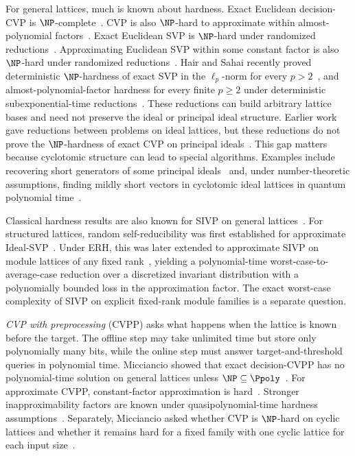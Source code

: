 For general lattices, much is known about hardness.  Exact
Euclidean decision-CVP is \(\NP\)-complete~\cite{vanEmdeBoas1981}.  CVP is
also \(\NP\)-hard to approximate within almost-polynomial
factors~\cite{DinurKindlerSafra1998}.  Exact Euclidean SVP is
\(\NP\)-hard under randomized reductions~\cite{Ajtai1998}.  Approximating
Euclidean SVP within some constant factor is also \(\NP\)-hard under randomized
reductions~\cite{Micciancio1998}.  Hair and
Sahai recently proved deterministic \(\NP\)-hardness of exact SVP in the
\(\ell_p\)-norm for every \(p>2\)~\cite{HairSahaiSTOC26}, and
almost-polynomial-factor hardness for every finite \(p\geq2\) under
deterministic subexponential-time reductions~\cite{HairSahaiFOCS26}.
These reductions can
build arbitrary lattice bases and need not preserve the ideal or principal
ideal structure.  Earlier work gave reductions between problems on ideal
lattices, but these reductions do not prove the \(\NP\)-hardness of exact CVP
on principal ideals~\cite{PeikertRosen2007}.  This gap matters because
cyclotomic structure can lead to special algorithms.  Examples include
recovering short generators of some principal ideals~\cite{CramerEtAl2016}
and, under number-theoretic assumptions, finding mildly short vectors in
cyclotomic ideal lattices in quantum polynomial
time~\cite{CramerDucasWesolowski2021}.

\ifdefined\withModuleSIVP
{Classical hardness results are also known for SIVP on general
lattices~\cite{BlomerSeifert1999,AggarwalChung2021}.  For structured
lattices, random self-reducibility was first established for
approximate Ideal-SVP~\cite{deBoerEtAl2020}.  Under ERH, this was later
extended to approximate SIVP on module lattices of any fixed
rank~\cite{deBoerEtAl2025}, yielding a polynomial-time worst-case-to-average-case
reduction over a discretized invariant distribution with a polynomially
bounded loss in the approximation factor.
The exact worst-case complexity of SIVP on explicit fixed-rank module
families is a separate question.}
\fi

\emph{CVP with preprocessing} (CVPP) asks what happens when the lattice is known
before the target.  The offline step may take unlimited time but store only
polynomially many bits, while the online step must answer target-and-threshold
queries in polynomial time.  Micciancio showed that exact
decision-CVPP has no polynomial-time solution on general lattices unless
\(\NP\subseteq\Ppoly\)~\cite{Micciancio2001}.  For approximate CVPP, constant-factor
approximation is hard~\cite{FeigeMicciancio2004}.  Stronger inapproximability
factors are known under quasipolynomial-time hardness
assumptions~\cite{AlekhnovichEtAl2005,KhotPopatVishnoi2012}.  Separately,
Micciancio asked whether CVP
is \(\NP\)-hard on cyclic lattices and whether it remains hard for a fixed
family with one cyclic lattice for each input size~\cite{Micciancio2007}.


